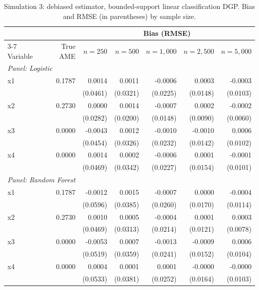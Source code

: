 \documentclass[12pt,a4paper]{article}
\numberwithin{equation}{section}
\theoremstyle{plain}
\theoremstyle{definition}
\begin{document}
	\begin{table}[htbp]
		\centering
		\small
		\begin{threeparttable}
			\caption{Simulation 3: debiased estimator, bounded-support linear classification DGP. Bias and RMSE (in parentheses) by sample size.}
			\label{tab:sim3_bias_classification_linear_uniform}
			\begin{tabular}{lrrrrrr}
				\toprule
				& & \multicolumn{5}{c}{Bias (RMSE)} \\
				\cmidrule(lr){3-7}
				Variable & True AME & $n=250$ & $n=500$ & $n=1,000$ & $n=2,500$ & $n=5,000$ \\
				\midrule
				\multicolumn{7}{l}{\textit{Panel: Logistic}} \\
				\quad x1 & 0.1787 & 0.0014 & 0.0011 & -0.0006 & 0.0003 & -0.0003 \\
				&  & (0.0461) & (0.0321) & (0.0225) & (0.0148) & (0.0103) \\
				\quad x2 & 0.2730 & 0.0000 & 0.0014 & -0.0007 & 0.0002 & -0.0002 \\
				&  & (0.0282) & (0.0200) & (0.0148) & (0.0090) & (0.0060) \\
				\quad x3 & 0.0000 & -0.0043 & 0.0012 & -0.0010 & -0.0010 & 0.0006 \\
				&  & (0.0454) & (0.0326) & (0.0232) & (0.0142) & (0.0102) \\
				\quad x4 & 0.0000 & 0.0014 & 0.0002 & -0.0006 & 0.0001 & -0.0001 \\
				&  & (0.0469) & (0.0342) & (0.0227) & (0.0154) & (0.0101) \\
				\midrule
				\multicolumn{7}{l}{\textit{Panel: Random Forest}} \\
				\quad x1 & 0.1787 & -0.0012 & 0.0015 & -0.0007 & 0.0000 & -0.0004 \\
				&  & (0.0596) & (0.0385) & (0.0260) & (0.0170) & (0.0114) \\
				\quad x2 & 0.2730 & 0.0010 & 0.0005 & -0.0004 & 0.0001 & 0.0003 \\
				&  & (0.0469) & (0.0313) & (0.0214) & (0.0121) & (0.0078) \\
				\quad x3 & 0.0000 & -0.0053 & 0.0007 & -0.0013 & -0.0009 & 0.0006 \\
				&  & (0.0519) & (0.0359) & (0.0241) & (0.0152) & (0.0104) \\
				\quad x4 & 0.0000 & 0.0004 & 0.0001 & 0.0001 & -0.0000 & -0.0000 \\
				&  & (0.0533) & (0.0381) & (0.0252) & (0.0164) & (0.0103) \\

\end{tabular}
\end{threeparttable}
\end{table}
\end{document}

